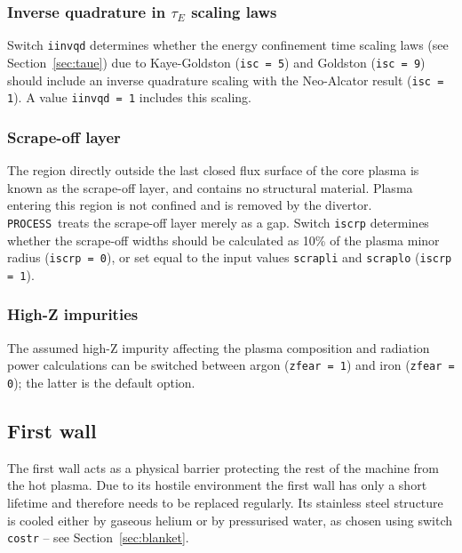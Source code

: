 \documentclass[11pt,a4paper]{report}
\newcommand{\process}{\mbox{\texttt{PROCESS}}}
\begin{document}
\subsubsection*{Inverse quadrature in $\tau_E$ scaling laws}

Switch \texttt{iinvqd} determines whether the energy confinement time scaling
laws (see Section~\ref{sec:taue}) due to Kaye-Goldston (\texttt{isc = 5}) and
Goldston (\texttt{isc = 9}) should include an inverse quadrature scaling with
the Neo-Alcator result (\texttt{isc = 1}). A value \texttt{iinvqd = 1}
includes this scaling.

\subsubsection*{Scrape-off layer}

The region directly outside the last closed flux surface of the core plasma is
known as the scrape-off layer, and contains no structural material.  Plasma
entering this region is not confined and is removed by the
divertor. \process\ treats the scrape-off layer merely as a gap. Switch
\texttt{iscrp} determines whether the scrape-off widths should be calculated
as 10\% of the plasma minor radius (\texttt{iscrp = 0}), or set equal to the
input values \texttt{scrapli} and \texttt{scraplo} (\texttt{iscrp = 1}).

\subsubsection*{High-Z impurities}

The assumed high-Z impurity affecting the plasma composition and radiation
power calculations can be switched between argon (\texttt{zfear = 1}) and iron
(\texttt{zfear = 0}); the latter is the default option.


\subsection{First wall}

The first wall acts as a physical barrier protecting the rest of the machine
from the hot plasma. Due to its hostile environment the first wall has only a
short lifetime and therefore needs to be replaced regularly. Its stainless
steel structure is cooled either by gaseous helium or by pressurised water, as
chosen using switch \texttt{costr} -- see Section~\ref{sec:blanket}.
\end{document}
